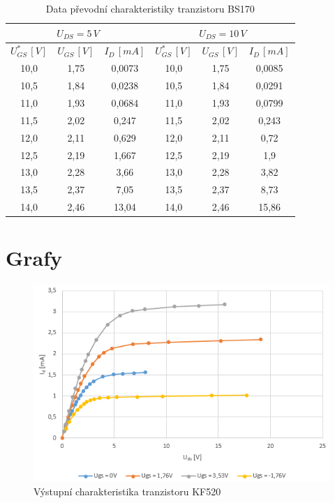 \documentclass[12pt]{article} %
\begin{document}
\begin{table}
\caption{Data převodní charakteristiky tranzistoru BS170}
\begin{tabular}{|c|c|c||c|c|c|}
\hline 
\multicolumn{3}{|c|}{$U_{DS}=5\,V$} & \multicolumn{3}{|c|}{$U_{DS}=10\,V$} \\ 
\hline 
$U_{GS}^*\,[V]$ & $U_{GS}\,[V]$ & $I_D\,[mA]$ & $U_{GS}^*\,[V]$ & $U_{GS}\,[V]$ & $I_D\,[mA]$ \\ 
\hline 
10,0 & 1,75 & 0,0073 & 10,0 & 1,75 & 0,0085 \\ 
\hline 
10,5 & 1,84 & 0,0238 & 10,5 & 1,84 & 0,0291 \\ 
\hline 
11,0 & 1,93 & 0,0684 & 11,0 & 1,93 & 0,0799 \\ 
\hline 
11,5 & 2,02 & 0,247 & 11,5 & 2,02 & 0,243 \\ 
\hline 
12,0 & 2,11 & 0,629 & 12,0 & 2,11 & 0,72 \\ 
\hline 
12,5 & 2,19 & 1,667 & 12,5 & 2,19 & 1,9 \\ 
\hline 
13,0 & 2,28 & 3,66 & 13,0 & 2,28 & 3,82 \\ 
\hline 
13,5 & 2,37 & 7,05 & 13,5 & 2,37 & 8,73 \\ 
\hline 
14,0 & 2,46 & 13,04 & 14,0 & 2,46 & 15,86 \\ 
\hline 
\end{tabular} 
\end{table}

\section{Grafy}
\begin{figure}[H]
\center
\includegraphics[scale=0.9]{vystup_kf520.png}
\caption{Výstupní charakteristika tranzistoru KF520}
\end{figure}
\end{document}
